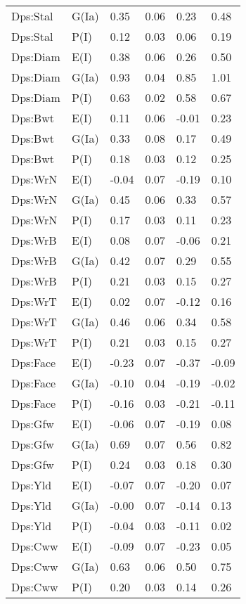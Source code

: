 \begin{center}
\begin{longtable}{|p{1.1in}|p{0.7in}|p{0.7in}|p{0.6in}|p{0.6in}|p{0.6in}|}
  Dps:Stal & G(Ia) & 0.35 & 0.06 & 0.23 & 0.48 \\ 
  Dps:Stal & P(I) & 0.12 & 0.03 & 0.06 & 0.19 \\ 
  Dps:Diam & E(I) & 0.38 & 0.06 & 0.26 & 0.50 \\ 
  Dps:Diam & G(Ia) & 0.93 & 0.04 & 0.85 & 1.01 \\ 
  Dps:Diam & P(I) & 0.63 & 0.02 & 0.58 & 0.67 \\ 
  Dps:Bwt & E(I) & 0.11 & 0.06 & -0.01 & 0.23 \\ 
  Dps:Bwt & G(Ia) & 0.33 & 0.08 & 0.17 & 0.49 \\ 
  Dps:Bwt & P(I) & 0.18 & 0.03 & 0.12 & 0.25 \\ 
  Dps:WrN & E(I) & -0.04 & 0.07 & -0.19 & 0.10 \\ 
  Dps:WrN & G(Ia) & 0.45 & 0.06 & 0.33 & 0.57 \\ 
  Dps:WrN & P(I) & 0.17 & 0.03 & 0.11 & 0.23 \\ 
  Dps:WrB & E(I) & 0.08 & 0.07 & -0.06 & 0.21 \\ 
  Dps:WrB & G(Ia) & 0.42 & 0.07 & 0.29 & 0.55 \\ 
  Dps:WrB & P(I) & 0.21 & 0.03 & 0.15 & 0.27 \\ 
  Dps:WrT & E(I) & 0.02 & 0.07 & -0.12 & 0.16 \\ 
  Dps:WrT & G(Ia) & 0.46 & 0.06 & 0.34 & 0.58 \\ 
  Dps:WrT & P(I) & 0.21 & 0.03 & 0.15 & 0.27 \\ 
  Dps:Face & E(I) & -0.23 & 0.07 & -0.37 & -0.09 \\ 
  Dps:Face & G(Ia) & -0.10 & 0.04 & -0.19 & -0.02 \\ 
  Dps:Face & P(I) & -0.16 & 0.03 & -0.21 & -0.11 \\ 
  Dps:Gfw & E(I) & -0.06 & 0.07 & -0.19 & 0.08 \\ 
  Dps:Gfw & G(Ia) & 0.69 & 0.07 & 0.56 & 0.82 \\ 
  Dps:Gfw & P(I) & 0.24 & 0.03 & 0.18 & 0.30 \\ 
  Dps:Yld & E(I) & -0.07 & 0.07 & -0.20 & 0.07 \\ 
  Dps:Yld & G(Ia) & -0.00 & 0.07 & -0.14 & 0.13 \\ 
  Dps:Yld & P(I) & -0.04 & 0.03 & -0.11 & 0.02 \\ 
  Dps:Cww & E(I) & -0.09 & 0.07 & -0.23 & 0.05 \\ 
  Dps:Cww & G(Ia) & 0.63 & 0.06 & 0.50 & 0.75 \\ 
  Dps:Cww & P(I) & 0.20 & 0.03 & 0.14 & 0.26 \\ 

\end{longtable}
\end{center}

